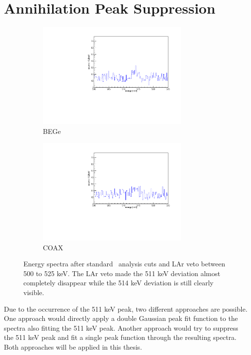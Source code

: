 \documentclass[encoding=utf8,british]{tumphthesis}
\begin{document}
\section{Annihilation Peak Suppression}
\label{sec:APS}


\begin{figure}[t!]
\centering
\begin{subfigure}{0.475\textwidth}
	\includegraphics[width=75mm]{./Bilder/500525LArVetoBEGes.pdf}
    \caption{BEGe}
  \label{fig:LArBEGes}
\end{subfigure}\hfill%
\begin{subfigure}{0.475\textwidth}
	\includegraphics[width=75mm]{./Bilder/500525LArVetoCOAX.pdf}
  \caption{COAX}
  \label{fig:LArCOAX}
\end{subfigure}
    \caption{
    Energy spectra after standard \gerda\ analysis cuts and LAr veto between 500 to 525 keV. 
    The LAr veto made the 511 keV deviation almost completely disappear while the 514 keV deviation is still clearly visible. 
    }
\end{figure}

Due to the occurrence of the 511 keV peak, two different approaches are possible.
One approach would directly apply a double Gaussian peak fit function to the spectra also fitting the 511 keV peak.
Another approach would try to suppress the 511 keV peak and fit a single peak function through the resulting spectra.
Both approaches will be applied in this thesis.
\\
\end{document}

